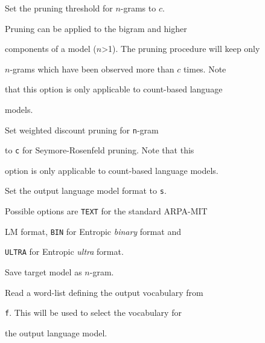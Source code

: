 \begin{optlist}





   Set the pruning threshold for $n$-grams to $c$. 


	Pruning can be applied to the bigram and higher


	components of a model ($n$>1). The pruning procedure will keep only 


	$n$-grams which have been observed more than $c$ times. Note


	that this option is only applicable to count-based language 


        models.





    Set weighted discount pruning for \texttt{n}-gram


        to \texttt{c} for Seymore-Rosenfeld pruning. Note that this


        option is only applicable to count-based language models.


  


   Set the output language model format to {\tt s}.


        Possible options are {\tt TEXT} for the standard ARPA-MIT


	LM format, {\tt BIN} for Entropic {\em binary} format and 


        {\tt ULTRA} for Entropic {\em ultra} format.


        


   Save target model as $n$-gram.





   Read a word-list defining the output vocabulary from


	{\tt f}. This will be used to select the vocabulary for 


	the output language model.





\end{optlist}












